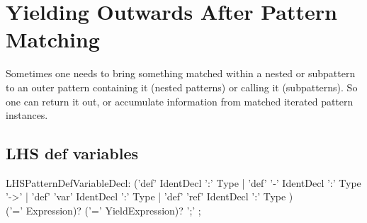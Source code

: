 
\section{Yielding Outwards After Pattern Matching} 

Sometimes one needs to bring something matched within a nested or subpattern to an outer pattern containing it (nested patterns) or calling it (subpatterns).
So one can return it out, or accumulate information from matched iterated pattern instances. 

\subsection{LHS def variables} 

\begin{rail} 
  LHSPatternDefVariableDecl: 
	('def' IdentDecl ':' Type |
	'def' '-' IdentDecl ':' Type '->' |
	'def' 'var' IdentDecl ':' Type |
	'def' 'ref' IdentDecl ':' Type ) \\
	('=' Expression)? ('=' YieldExpression)? ';'
	;
\end{rail}

